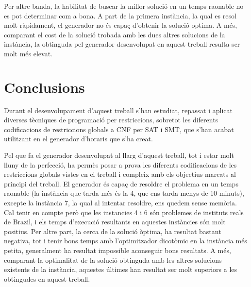 \documentclass[11pt,a4paper,oneside]{article}
\begin{document}
  Per altre banda, la habilitat de buscar la millor solució en un temps raonable 
  no es pot determinar com a bona. A part de la primera instància, 
  la qual es resol molt ràpidament, el generador no és capaç d'obtenir la solució optima.
   A més, comparant el cost de la solució trobada amb les dues altres solucions de la instància, la obtinguda pel generador desenvolupat en aquest treball resulta ser molt més elevat.

  \section{Conclusions}

  Durant el desenvolupament d'aquest treball s'han estudiat, repassat i aplicat diverses tècniques de programació per restriccions, 
  sobretot les diferents codificacions de restriccions globals a CNF per SAT i SMT, que s'han acabat utilitzant en el generador d'horaris que s'ha creat. 

  Pel que fa el generador desenvolupat al llarg d'aquest treball, tot i estar molt lluny de la perfecció, 
  ha permès posar a prova les diferents codificacions de les restriccions globals vistes en el treball 
  i compleix amb els objectius marcats al principi del treball. El generador és capaç de resoldre el problema en un temps raonable (la instància que tarda més és la 4, que ens tarda menys de 10 minuts), 
  excepte la instància 7, la qual al intentar resoldre, ens quedem sense memòria. Cal tenir en compte però que les instancies 4 i 6 són problemes de instituts reals de Brazil, i els temps d'execució resultants en aquestes instàncies són molt positius.
  Per altre part, la cerca de la solució òptima, ha resultat bastant negativa, tot i tenir bons temps amb l'optimitzador dicotòmic en la instància més petita, generalment ha resultat impossible aconseguir bons resultats. 
  A més, comparant la optimalitat de la solució obtinguda amb les altres solucions existents de la instància, aquestes últimes han resultat ser molt superiors a les obtingudes en aquest treball.

  
  
\end{document}
